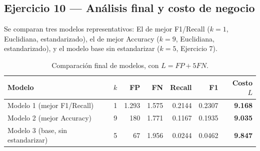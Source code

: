 \subsection{Ejercicio 10 --- Análisis final y costo de negocio}

Se comparan tres modelos representativos: El de mejor F1/Recall
($k=1$, Euclidiana, estandarizado), el de mejor Accuracy ($k=9$,
Euclidiana, estandarizado), y el modelo base sin estandarizar ($k=5$,
Ejercicio 7).

\begin{table}[H]
\centering
\small
\begin{tabular}{lrrrrrr}
\toprule
Modelo & $k$ & FP & FN & Recall & F1 & Costo $L$ \\
\midrule
Modelo 1 (mejor F1/Recall)          & 1 & 1.293 & 1.575 & 0.2144 & 0.2307 & \textbf{9.168} \\
Modelo 2 (mejor Accuracy)           & 9 &   180 & 1.771 & 0.1167 & 0.1935 & \textbf{9.035} \\
Modelo 3 (base, sin estandarizar)   & 5 &    67 & 1.956 & 0.0244 & 0.0462 & \textbf{9.847} \\
\bottomrule
\end{tabular}
\caption{Comparación final de modelos, con $L = FP + 5FN$.}
\end{table}

